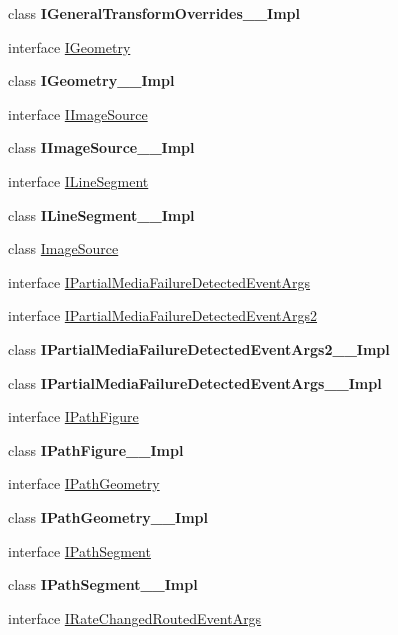 \begin{DoxyCompactItemize}
class {\bfseries I\+General\+Transform\+Overrides\+\_\+\+\_\+\+Impl}
\item 
interface \hyperlink{interface_windows_1_1_u_i_1_1_xaml_1_1_media_1_1_i_geometry}{I\+Geometry}
\item 
class {\bfseries I\+Geometry\+\_\+\+\_\+\+Impl}
\item 
interface \hyperlink{interface_windows_1_1_u_i_1_1_xaml_1_1_media_1_1_i_image_source}{I\+Image\+Source}
\item 
class {\bfseries I\+Image\+Source\+\_\+\+\_\+\+Impl}
\item 
interface \hyperlink{interface_windows_1_1_u_i_1_1_xaml_1_1_media_1_1_i_line_segment}{I\+Line\+Segment}
\item 
class {\bfseries I\+Line\+Segment\+\_\+\+\_\+\+Impl}
\item 
class \hyperlink{class_windows_1_1_u_i_1_1_xaml_1_1_media_1_1_image_source}{Image\+Source}
\item 
interface \hyperlink{interface_windows_1_1_u_i_1_1_xaml_1_1_media_1_1_i_partial_media_failure_detected_event_args}{I\+Partial\+Media\+Failure\+Detected\+Event\+Args}
\item 
interface \hyperlink{interface_windows_1_1_u_i_1_1_xaml_1_1_media_1_1_i_partial_media_failure_detected_event_args2}{I\+Partial\+Media\+Failure\+Detected\+Event\+Args2}
\item 
class {\bfseries I\+Partial\+Media\+Failure\+Detected\+Event\+Args2\+\_\+\+\_\+\+Impl}
\item 
class {\bfseries I\+Partial\+Media\+Failure\+Detected\+Event\+Args\+\_\+\+\_\+\+Impl}
\item 
interface \hyperlink{interface_windows_1_1_u_i_1_1_xaml_1_1_media_1_1_i_path_figure}{I\+Path\+Figure}
\item 
class {\bfseries I\+Path\+Figure\+\_\+\+\_\+\+Impl}
\item 
interface \hyperlink{interface_windows_1_1_u_i_1_1_xaml_1_1_media_1_1_i_path_geometry}{I\+Path\+Geometry}
\item 
class {\bfseries I\+Path\+Geometry\+\_\+\+\_\+\+Impl}
\item 
interface \hyperlink{interface_windows_1_1_u_i_1_1_xaml_1_1_media_1_1_i_path_segment}{I\+Path\+Segment}
\item 
class {\bfseries I\+Path\+Segment\+\_\+\+\_\+\+Impl}
\item 
interface \hyperlink{interface_windows_1_1_u_i_1_1_xaml_1_1_media_1_1_i_rate_changed_routed_event_args}{I\+Rate\+Changed\+Routed\+Event\+Args}
\item 

\end{DoxyCompactItemize}

